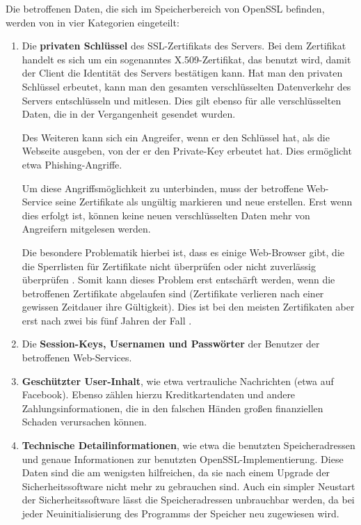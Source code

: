\documentclass[12pt]{article}
\begin{document}
Die betroffenen Daten, die sich im Speicherbereich von OpenSSL befinden, werden von \citet{codenomicon_heartbleed_2014} in vier Kategorien eingeteilt: 
\begin{enumerate}
\item Die \textbf{privaten Schlüssel} des SSL-Zertifikats des Servers. Bei dem Zertifikat handelt es sich um ein sogenanntes X.509-Zertifikat, das benutzt wird, damit der Client die Identität des Servers bestätigen kann. Hat man den privaten Schlüssel erbeutet, kann man den gesamten verschlüsselten Datenverkehr des Servers entschlüsseln und mitlesen. Dies gilt ebenso für alle verschlüsselten Daten, die in der Vergangenheit gesendet wurden. 

Des Weiteren kann sich ein Angreifer, wenn er den Schlüssel hat, als die Webseite ausgeben, von der er den Private-Key erbeutet hat. Dies ermöglicht etwa Phishing-Angriffe. 

Um diese Angriffsmöglichkeit zu unterbinden, muss der betroffene Web-Service seine Zertifikate als ungültig markieren und neue erstellen. Erst wenn dies erfolgt ist, können keine neuen verschlüsselten Daten mehr von Angreifern mitgelesen werden.

Die besondere Problematik hierbei ist, dass es einige Web-Browser gibt, die die Sperrlisten für Zertifikate nicht überprüfen oder nicht zuverlässig überprüfen \citep{seltzer_chrome_2014}. Somit kann dieses Problem erst entschärft werden, wenn die betroffenen Zertifikate abgelaufen sind (Zertifikate verlieren nach einer gewissen Zeitdauer ihre Gültigkeit). Dies ist bei den meisten Zertifikaten aber erst nach zwei bis fünf Jahren der Fall \citep{huston_best_2009}.
\item Die \textbf{Session-Keys, Usernamen und Passwörter} der Benutzer der betroffenen Web-Services.
\item \textbf{Geschützter User-Inhalt}, wie etwa vertrauliche Nachrichten (etwa auf Facebook). Ebenso zählen hierzu Kreditkartendaten und andere Zahlungsinformationen, die in den falschen Händen großen finanziellen Schaden verursachen können. 
\item \textbf{Technische Detailinformationen}, wie etwa die benutzten Speicheradressen und genaue Informationen zur benutzten OpenSSL-Implementierung. Diese Daten sind die am wenigsten hilfreichen, da sie nach einem Upgrade der Sicherheitssoftware nicht mehr zu gebrauchen sind. Auch ein simpler Neustart der Sicherheitssoftware lässt die Speicheradressen unbrauchbar werden, da bei jeder Neuinitialisierung des Programms der Speicher neu zugewiesen wird. 
\end{enumerate}
\end{document}
